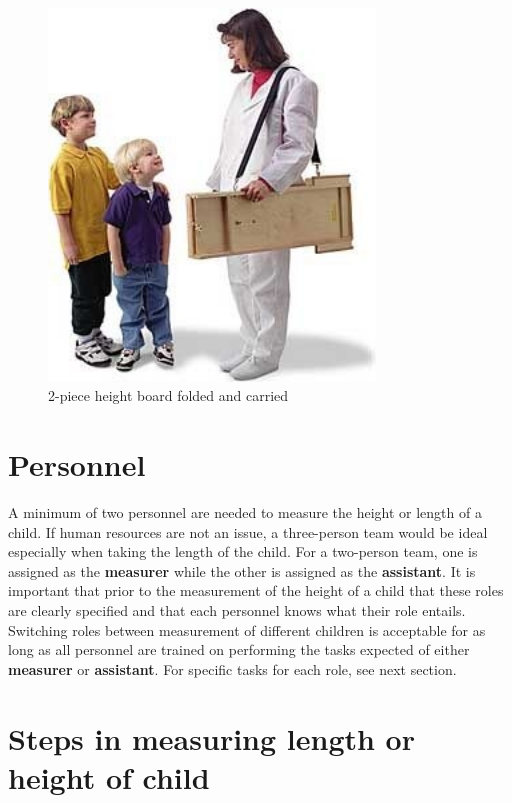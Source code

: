 \documentclass[12pt,]{book}
\theoremstyle{definition}
\theoremstyle{definition}
\theoremstyle{definition}
\theoremstyle{remark}
\begin{document}
\begin{figure}

{\centering \includegraphics[width=3.42in]{images/shorrBrdcarry} 

}

\caption{2-piece height board folded and carried}\label{fig:height03}
\end{figure}

\hypertarget{personnel-1}{%
\section{Personnel}\label{personnel-1}}

A minimum of two personnel are needed to measure the height or length of
a child. If human resources are not an issue, a three-person team would
be ideal especially when taking the length of the child. For a
two-person team, one is assigned as the \textbf{measurer} while the
other is assigned as the \textbf{assistant}. It is important that prior
to the measurement of the height of a child that these roles are clearly
specified and that each personnel knows what their role entails.
Switching roles between measurement of different children is acceptable
for as long as all personnel are trained on performing the tasks
expected of either \textbf{measurer} or \textbf{assistant}. For specific
tasks for each role, see next section.

\hypertarget{steps-in-measuring-length-or-height-of-child}{%
\section{Steps in measuring length or height of
child}\label{steps-in-measuring-length-or-height-of-child}}
\end{document}
